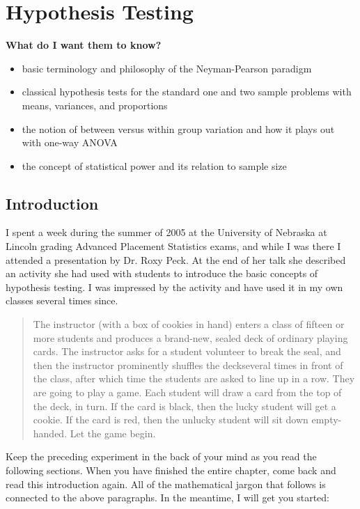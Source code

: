 \chapter{Hypothesis Testing}
\label{sec-10}

\textbf{What do I want them to know?}
\begin{itemize}
\item basic terminology and philosophy of the Neyman-Pearson paradigm
\item classical hypothesis tests for the standard one and two sample
problems with means, variances, and proportions
\item the notion of between versus within group variation and how it plays
out with one-way ANOVA
\item the concept of statistical power and its relation to sample size
\end{itemize}

\section{Introduction}
\label{sec-10-1}

I spent a week during the summer of 2005 at the University of Nebraska
at Lincoln grading Advanced Placement Statistics exams, and while I
was there I attended a presentation by Dr. Roxy Peck. At the end of
her talk she described an activity she had used with students to
introduce the basic concepts of hypothesis testing. I was impressed by
the activity and have used it in my own classes several times since.

\begin{quote}
The instructor (with a box of cookies in hand) enters a class of
fifteen or more students and produces a brand-new, sealed deck of
ordinary playing cards. The instructor asks for a student volunteer to
break the seal, and then the instructor prominently shuffles the
deckseveral times in front of the class, after which
time the students are asked to line up in a row. They are going to
play a game. Each student will draw a card from the top of the deck,
in turn. If the card is black, then the lucky student will get a
cookie. If the card is red, then the unlucky student will sit down
empty-handed. Let the game begin.
\end{quote}

Keep the preceding experiment in the back of your mind as you read the
following sections. When you have finished the entire chapter, come
back and read this introduction again. All of the mathematical jargon
that follows is connected to the above paragraphs. In the meantime, I
will get you started:

